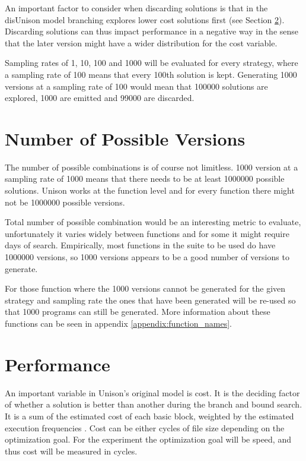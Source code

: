 An important factor to consider when discarding solutions is that in the disUnison model
branching explores lower cost solutions first (see Section \ref{sec:performance}). Discarding
solutions can thus impact performance in a negative way in the sense that the later
version might have a wider distribution for the cost variable.

Sampling rates of 1, 10, 100 and 1000 will be evaluated for every strategy, where a
sampling rate of 100 means that every 100th solution is kept. Generating 1000 versions
at a sampling rate of 100 would mean that 100000 solutions are explored, 1000 are emitted
and 99000 are discarded.

\section{Number of Possible Versions}

The number of possible combinations is of course not limitless. 1000 version at a sampling
rate of 1000 means that there needs to be at least 1000000 possible solutions. Unison works
at the function level and for every function there might not be 1000000 possible versions.

Total number of possible combination would be an interesting metric to evaluate, unfortunately
it varies widely between functions and for some it might require days of search. Empirically,
most functions in the suite to be used do have 1000000 versions, so 1000 versions appears
to be a good number of versions to generate.

For those function where the 1000 versions cannot be generated for the given strategy and
sampling rate the ones that have been generated will be re-used so that 1000 programs can
still be generated. More information about these functions can be seen in appendix
\ref{appendix:function_names}.

\section{Performance}
\label{sec:performance}

An important variable in Unison's original model is cost. It is the deciding factor of
whether a solution is better than another during the branch and bound search. It is a sum
of the estimated cost of each basic block, weighted by the estimated execution frequencies
\cite{unison-docs}. Cost can be either cycles of file size depending on the optimization
goal. For the experiment the optimization goal will be speed, and thus cost will be
measured in cycles.

